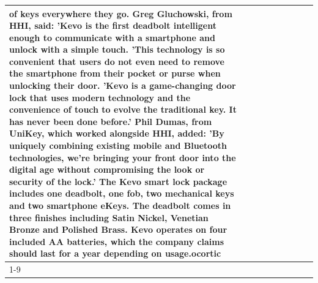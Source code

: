 \begin{table}[H]
\begin{tabular}{lllrlllll}
of keys everywhere they go. Greg Gluchowski, from HHI, said: 'Kevo is the first deadbolt intelligent enough to communicate with a smartphone and unlock with a simple touch. 'This technology is so convenient that users do not even need to remove the smartphone from their pocket or purse when unlocking their door. 'Kevo is a game-changing door lock that uses modern technology and the convenience of touch to evolve the traditional key. It has never been done before.' Phil Dumas, from UniKey, which worked alongside HHI, added: 'By uniquely combining existing mobile and Bluetooth technologies, we’re bringing your front door into the digital age without compromising the look or security of the lock.' The Kevo smart lock package includes one deadbolt, one fob, two mechanical keys and two smartphone eKeys. The deadbolt comes in three finishes including Satin Nickel, Venetian Bronze and Polished Brass. Kevo operates on four included AA batteries, which the company claims should last for a year depending on usage.ocortic \\
\cline{1-9}

\end{tabular}
\end{table}
